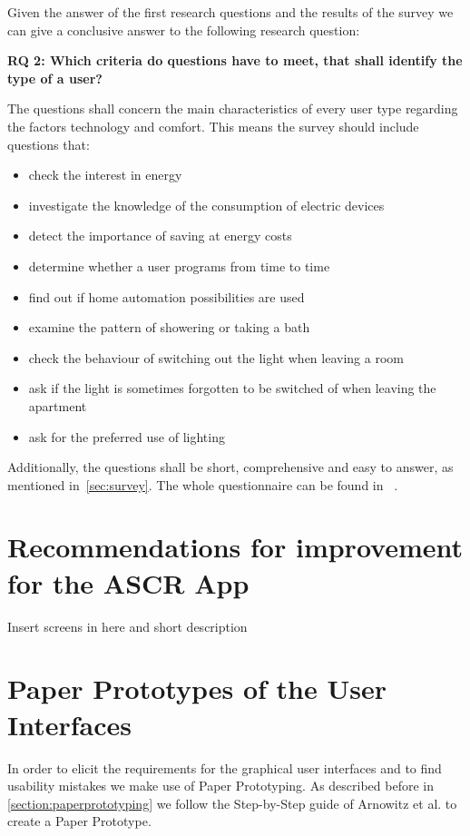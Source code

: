 Given the answer of the first research questions and the results of the survey we can give a conclusive answer to the following research question:

\textbf{RQ 2: Which criteria do questions have to meet, that shall identify the type of a user?}

The questions shall concern the main characteristics of every user type regarding the factors technology and comfort. This means the survey should include questions that:

\begin{itemize}
	\item check the interest in energy
	\item investigate the knowledge of the consumption of electric devices
	\item detect the importance of saving at energy costs
	\item determine whether a user programs from time to time
	\item find out if home automation possibilities are used
	\item examine the pattern of showering or taking a bath
	\item check the behaviour of switching out the light when leaving a room
	\item ask if the light is sometimes forgotten to be switched of when leaving the apartment
	\item ask for the preferred use of lighting 	
\end{itemize}

Additionally, the questions shall be short, comprehensive and easy to answer, as mentioned in~\ref{sec:survey}. The whole questionnaire can be found in ~.

\section{Recommendations for improvement for the ASCR App}

Insert screens in here and short description

\section{Paper Prototypes of the User Interfaces}
In order to elicit the requirements for the graphical user interfaces and to find usability mistakes we make use of Paper Prototyping. As described before in \ref{section:paperprototyping} we follow the Step-by-Step guide of Arnowitz et al. \cite{arnowitz2010effective} to create a Paper Prototype.


